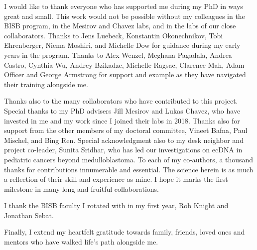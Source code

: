 \begin{frontmatter}
\listoffigures  %
\listoftables   %



%
%
\begin{acknowledgements}
I would like to thank everyone who has supported me during my PhD in ways great and small. This work would not be possible without my colleagues in the BISB program, in the Mesirov and Chavez labs, and in the labs of our close collaborators. Thanks to Jens Luebeck, Konstantin Okonechnikov, Tobi Ehrenberger, Niema Moshiri, and Michelle Dow for guidance during my early years in the program. Thanks to Alex Wenzel, Meghana Pagadala, Andrea Castro, Cynthia Wu, Andrey Bzikadze, Michelle Ragsac, Clarence Mah, Adam Officer and George Armstrong for support and example as they have navigated their training alongside me. 

\par Thanks also to the many collaborators who have contributed to this project. Special thanks to my PhD advisers Jill Mesirov and Lukas Chavez, who have invested in me and my work since I joined their labs in 2018. Thanks also for support from the other members of my doctoral committee, Vineet Bafna, Paul Mischel, and Bing Ren.  Special acknowledgment also to my desk neighbor and project co-leader, Sunita Sridhar, who has led our investigations on ecDNA in pediatric cancers beyond medulloblastoma. To each of my co-authors, a thousand thanks for contributions innumerable and essential. The science herein is as much a reflection of their skill and experience as mine.  I hope it marks the first milestone in many long and fruitful collaborations.

\par I thank the BISB faculty I rotated with in my first year, Rob Knight and Jonathan Sebat. 

\par Finally, I extend my heartfelt gratitude towards family, friends, loved ones and mentors who have walked life's path alongside me.


\end{acknowledgements}
\end{frontmatter}
